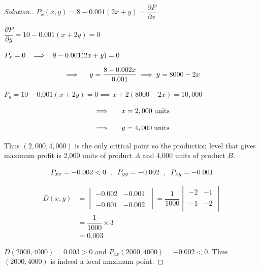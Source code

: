 \documentclass[11pt,a4paper]{article}
\theoremstyle{definition}
\newenvironment{solution}
  {\renewcommand{\qedsymbol}{}\begin{proof}[\textit{Solution}.]}
  {\end{proof}}
\begin{document}
\begin{solution}


$\displaystyle{P_x(x,y) = 8 - 0.001(2x + y)= \dfrac{\partial P}{\partial x}}$


$\displaystyle{\dfrac{\partial P}{\partial y} = 10 - 0.001(x + 2y) = 0}$


$\displaystyle{P_x = 0 \hspace{0.2cm}  \implies  \hspace{0.2cm} 8 - 0.001(2x + y)= 0}$

$$\implies \hspace{0.4cm} y = \dfrac{8 - 0.002x}{0.001} \implies y = 8000 - 2x$$


$\displaystyle{P_y = 10 - 0.001(x + 2y) = 0\implies x + 2(8000 - 2x) = 10, 000}$


$$\implies\hspace{0.5cm} x = 2,000\hspace{0.1cm}\text{units}$$

$$\implies \hspace{0.5cm} y = 4,000\hspace{0.1cm}\text{units}$$

Thus $(2,000, 4,000)$ is the only critical point so the production level that gives maximum profit is 2,000 units of product $A$ and 4,000 units of product $B$.

$$P_{xx} = -0.002 < 0\hspace{0.2cm}  , \hspace{0.2cm} P_{yy} = -0.002 \hspace{0.2cm}  , \hspace{0.2cm} P_{xy} = -0.001$$

\begin{align*}
D(x,y) & = \begin{vmatrix}
-0.002 & -0.001\\\\
-0.001 & -0.002\
\end{vmatrix}= \dfrac{1}{1000}\begin{vmatrix}
-2 & -1\\\\
-1 & -2\\
\end{vmatrix}\\
& = \dfrac{1}{1000}\times 3\\
& = 0.003
\end{align*}

$D(2000,4000) = 0.003 > 0$ and $P_{xx}(2000,4000) = -0.002<0$. Thus $(2000,4000)$ is indeed a local maximum point.
\end{solution}
\end{document}
